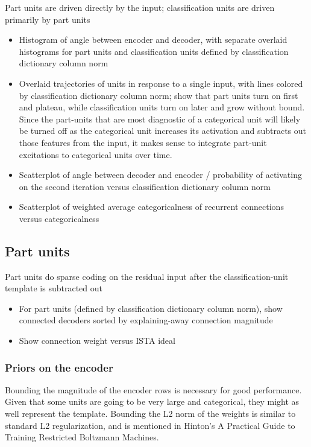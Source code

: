 \documentclass{article} %
\begin{document}
Part units are driven directly by the input; classification units are driven primarily by part units
\begin{itemize}
\item Histogram of angle between encoder and decoder, with separate overlaid histograms for part units and classification units defined by classification dictionary column norm
\item Overlaid trajectories of units in response to a single input, with lines colored by classification dictionary column norm; show that part units turn on first and plateau, while classification units turn on later and grow without bound.  Since the part-units that are most diagnostic of a categorical unit will likely be turned off as the categorical unit increases its activation and subtracts out those features from the input, it makes sense to integrate part-unit excitations to categorical units over time.
\item Scatterplot of angle between decoder and encoder / probability of activating on the second iteration versus classification dictionary column norm
\item Scatterplot of weighted average categoricalness of recurrent connections versus categoricalness
\end{itemize}


\subsection{Part units}

Part units do sparse coding on the residual input after the classification-unit template is subtracted out
\begin{itemize}
\item For part units (defined by classification dictionary column norm), show connected decoders sorted by explaining-away connection magnitude
\item Show connection weight versus ISTA ideal
\end{itemize}

\subsubsection{Priors on the encoder}

Bounding the magnitude of the encoder rows is necessary for good performance.  %
Given that some units are going to be very large and categorical, they might as well represent the template.  Bounding the L2 norm of the weights is similar to standard L2 regularization, and is mentioned in Hinton's A Practical Guide to Training Restricted Boltzmann Machines.  
\end{document}
